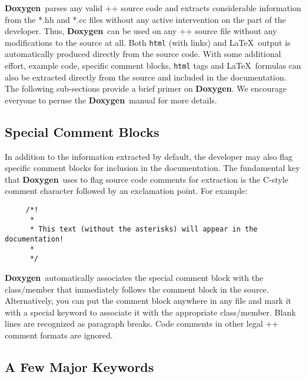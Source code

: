 \documentclass[11pt]{nmemo}
\newcommand{\doxy}{{\normalfont\bfseries Doxygen}}
\begin{document}
\doxy\ parses any valid \C++ source code and extracts considerable 
information from the *.hh
and *.cc files without any active intervention on the part of the developer.
Thus, \doxy\ can be used on any \C++ source file
without any modifications to the source at all. 
Both \texttt{html} (with links)
and \LaTeX\ output is automatically produced directly from the source code.
With some additional effort, example code, specific comment blocks, \texttt{html}
 tags and \LaTeX\
formulas can also be extracted directly from the source
and included in the documentation.  The following
sub-sections provide a brief primer on \doxy. We encourage everyone to peruse
the \doxy\ manual for more details.

\subsection{Special Comment Blocks}
\label{sec:spcom}

In addition to the information extracted by default,
the developer may also flag specific
comment blocks for inclusion in the documentation.
The fundamental key that \doxy\ uses to flag source code comments for
extraction is the C-style comment character followed by an exclamation
point. For example:
\begin{verbatim}
     /*!
      *
      * This text (without the asterisks) will appear in the documentation!
      *
      */
\end{verbatim}
\doxy\ automatically associates
the special comment block with the class/member that immediately follows the 
comment block in the source. Alternatively, you can put the comment block
anywhere in any file and mark it with a special keyword to associate it
with the appropriate class/member. Blank lines are recognized as paragraph
breaks. Code comments in other legal \C++ comment formats are ignored.

\subsection{A Few Major Keywords}
\end{document}
